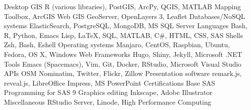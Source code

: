 \begin{cvtechskills}
    \cvtechskill    
        {Desktop GIS}
        {R (various libraries), PostGIS, ArcPy, QGIS, MATLAB Mapping Toolbox, ArcGIS}
        {}
        {}
    \cvtechskill    
        {Web GIS}
        {GeoServer, OpenLayers 3, Leaflet}
        {}
        {}
    \cvtechskill    
        {Databases/NoSQL systems}
        {ElasticSearch, PostgreSQL, MongoDB, MS SQL Server}
        {}
        {}
    \cvtechskill    
        {Languages}
        {Bash, R, Python, Emacs Lisp, LaTeX, SQL, MATLAB, C#, HTML, CSS, SAS}
        {}
        {}
    \cvtechskill    
        {Shells}
        {Zsh, Bash, Eshell}
        {}
        {}
    \cvtechskill    
        {Operating systems}
        {Manjaro, CentOS, Raspbian, Ubuntu, Fedora, OS X, Windows}
        {}
        {}  
    \cvtechskill    
        {Web Frameworks}
        {Hugo, Shiny, Jekyll, Microsoft .NET}
        {}
        {}  
    \cvtechskill
        {Tools}
        {Emacs (Spacemacs), Vim, Git, Docker, RStudio, Microsoft Visual Studio}
        {}
        {}
    \cvtechskill    
        {APIs}
        {OSM Nominatim, Twitter, Flickr, Zillow}
        {}
        {}
    \cvtechskill    
        {Presentation software}
        {remark.js, reveal.js, LibreOffice Impress, MS PowerPoint}
        {}
        {}
    \cvtechskill
        {Certifications}
        {Base SAS Programming for SAS 9}
        {}
        {}
    \cvtechskill
        {Graphics editing}
        {Inkscape, Adobe Illustrator}
        {}
        {}
    \cvtechskill
        {Miscellaneous}
        {RStudio Server, Linode, High Performance Computing}
        {}
        {}
\end{cvtechskills}
